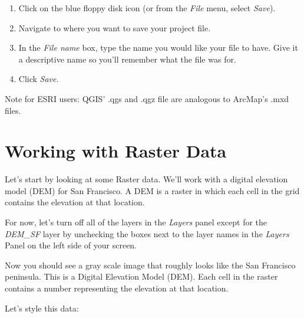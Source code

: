 \documentclass[
]{article}
\providecommand{\tightlist}{%
  \setlength{\itemsep}{0pt}\setlength{\parskip}{0pt}}
\begin{document}
\begin{enumerate}
\def\labelenumi{\arabic{enumi}.}
\tightlist
\item
  Click on the blue floppy disk icon (or from the \emph{File} menu, select \emph{Save}).
\item
  Navigate to where you want to save your project file.
\item
  In the \emph{File name} box, type the name you would like your file to have. Give it a descriptive name so you'll remember what the file was for.
\item
  Click \emph{Save}.
\end{enumerate}

Note for ESRI users: QGIS' .qgs and .qgz file are analogous to ArcMap's .mxd files.

\hypertarget{working-with-raster-data}{%
\section{Working with Raster Data}\label{working-with-raster-data}}

Let's start by looking at some Raster data. We'll work with a digital elevation model (DEM) for San Francisco. A DEM is a raster in which each cell in the grid contains the elevation at that location.

For now, let's turn off all of the layers in the \emph{Layers} panel except for the \emph{DEM\_SF} layer by unchecking the boxes next to the layer names in the \emph{Layers} Panel on the left side of your screen.

Now you should see a gray scale image that roughly looks like the San Francisco peninsula. This is a Digital Elevation Model (DEM). Each cell in the raster contains a number representing the elevation at that location.

Let's style this data:
\end{document}
